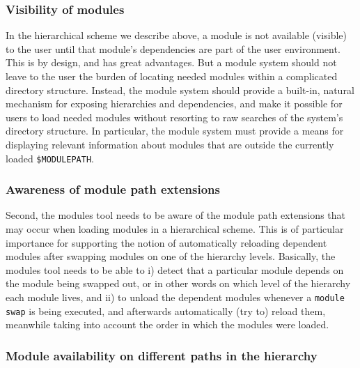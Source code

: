 \subsubsection{Visibility of modules}
\label{sec:hierarchical_consequences_visibility}

In the hierarchical scheme we describe above, a module is not available (visible) to the user until that
module's dependencies are part of the user environment.  This
is by design, and has great advantages. But a module system should not leave to the
user the burden of locating needed modules within a complicated directory structure.  Instead, the module system should provide a built-in, natural mechanism for exposing hierarchies and
dependencies, and make it possible for users to load needed modules
without resorting to raw searches of the system's directory structure. In particular, the module system must provide a means for
displaying relevant information about modules that are outside the 
currently loaded \texttt{\small \$MODULEPATH}.


\subsubsection{Awareness of module path extensions}
\label{sec:hierarchical_consequences_extensions}

Second, the modules tool needs to be aware of the module path extensions that
may occur when loading modules in a hierarchical scheme. This is of
particular importance for supporting the notion of automatically reloading
dependent modules after swapping modules on one of the hierarchy levels.
Basically, the modules tool needs to be able to i) detect that a particular
module depends on the module being swapped out, or in other words on which
level of the hierarchy each module lives, and ii) to unload the dependent
modules whenever a \texttt{\small module swap} is being executed, and afterwards
automatically (try to) reload them, meanwhile taking into
account the order in which the modules were loaded.

\subsubsection{Module availability on different paths in the hierarchy}
\label{sec:hierarchical_consequences_availability}

